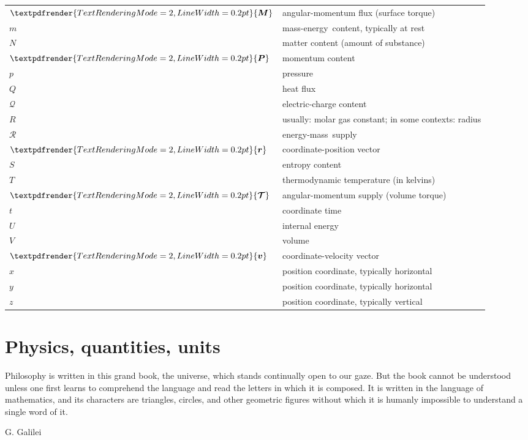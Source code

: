 \documentclass[a4paper,12pt,%
onecolumn,oneside,%
british%
]{memoir}
\renewcommand*{\bm}[1]{\textpdfrender{TextRenderingMode=2,LineWidth=0.2pt}{\boldsymbol{#1}}}
\renewcommand*{\|}[1][]{\nonscript\:#1\vert\nonscript\:\mathopen{}}
\newcommand*{\energym}{energy-mass}
\newcommand*{\masse}{mass-energy}
\newcommand*{\yr}{\bm{r}}
\newcommand*{\yv}{\bm{v}}
\newcommand*{\yN}{N}
\newcommand*{\ym}{m}%
\newcommand*{\yU}{U}
\newcommand*{\yQ}{Q}%
\newcommand*{\yR}{\mathcal{R}}%
\newcommand*{\yP}{\bm{P}}
\newcommand*{\ytoo}{\mathcal{T}}%
\newcommand*{\yto}{\bm{\ytoo}}%
\newcommand*{\yM}{\bm{M}}%
\newcommand*{\yS}{S}
\newcommand*{\yT}{T}%
\newcommand*{\yC}{\mathcal{Q}}
\begin{document}
\begin{table}[p]
\begin{tabularx}{1.0\linewidth}{ll}
    $\yM$ & angular-momentum flux (surface torque)
    \\
    $\ym$ & \masse\ content, typically at rest
    \\
    $\yN$ & matter content (amount of substance)
    \\
    $\yP$ & momentum content
    \\
    $p$ & pressure
    \\
    $\yQ$ & heat flux
    \\
    $\yC$ & electric-charge content
    \\
    $R$ & usually: molar gas constant; in some contexts: radius
    \\
    $\yR$ & \energym\ supply
    \\
    $\yr$ & coordinate-position vector
    \\
    $\yS$ & entropy content
    \\
    $\yT$ & thermodynamic temperature (in kelvins)
    \\
    $\yto$ & angular-momentum supply (volume torque)
    \\
    $t$ & coordinate time
    \\
    $\yU$ & internal energy
    \\
    $V$ & volume
    \\
    $\yv$ & coordinate-velocity vector
    \\
    $x$ & position coordinate, typically horizontal
    \\
    $y$ & position coordinate, typically horizontal
    \\
    $z$ & position coordinate, typically vertical
  \end{tabularx}
\end{table}


\printpagenotes*
\cleartooddpage
\chapter{Physics, quantities, units}
\label{cha:physics_quantities_units}

\epigraph{Philosophy is written in this grand book, the universe, which stands continually open to our gaze. But the book cannot be understood unless one first learns to comprehend the language and read the letters in which it is composed. It is written in the language of mathematics, and its characters are triangles, circles, and other geometric figures without which it is humanly impossible to understand a single word of it.}{G. Galilei \cites*{galilei1623}}
\end{document}
